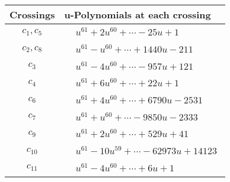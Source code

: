 \documentclass[1p]{elsarticle_modified}
\theoremstyle{definition}
\begin{document}
\begin{tabular}{m{50pt}|m{274pt}}
Crossings & \hspace{64pt}u-Polynomials at each crossing \\
\hline $$\begin{aligned}c_{1},c_{5}\end{aligned}$$&$\begin{aligned}
&u^{61}+2 u^{60}+\cdots-25 u+1
\end{aligned}$\\
\hline $$\begin{aligned}c_{2},c_{8}\end{aligned}$$&$\begin{aligned}
&u^{61}- u^{60}+\cdots+1440 u-211
\end{aligned}$\\
\hline $$\begin{aligned}c_{3}\end{aligned}$$&$\begin{aligned}
&u^{61}-4 u^{60}+\cdots-957 u+121
\end{aligned}$\\
\hline $$\begin{aligned}c_{4}\end{aligned}$$&$\begin{aligned}
&u^{61}+6 u^{60}+\cdots+22 u+1
\end{aligned}$\\
\hline $$\begin{aligned}c_{6}\end{aligned}$$&$\begin{aligned}
&u^{61}+4 u^{60}+\cdots+6790 u-2531
\end{aligned}$\\
\hline $$\begin{aligned}c_{7}\end{aligned}$$&$\begin{aligned}
&u^{61}+u^{60}+\cdots-9850 u-2333
\end{aligned}$\\
\hline $$\begin{aligned}c_{9}\end{aligned}$$&$\begin{aligned}
&u^{61}+2 u^{60}+\cdots+529 u+41
\end{aligned}$\\
\hline $$\begin{aligned}c_{10}\end{aligned}$$&$\begin{aligned}
&u^{61}-10 u^{59}+\cdots-62973 u+14123
\end{aligned}$\\
\hline $$\begin{aligned}c_{11}\end{aligned}$$&$\begin{aligned}
&u^{61}-4 u^{60}+\cdots+6 u+1
\end{aligned}$\\
\hline
\end{tabular}\\~\\
\end{document}
